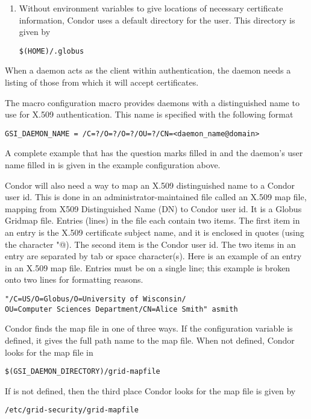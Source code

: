 \begin{description}
\begin{enumerate}
\item
Without environment variables to give locations of necessary
certificate information,
Condor uses a default directory for the user.
This directory is given by 
\begin{verbatim}
$(HOME)/.globus
\end{verbatim}
\end{enumerate}

When a daemon acts as the client within authentication,
the daemon needs a listing of those from which it
will accept certificates.

The macro  configuration macro
provides daemons with a distinguished name to use for
X.509 authentication.
This name is specified with the following format
\footnotesize
\begin{verbatim}
GSI_DAEMON_NAME = /C=?/O=?/O=?/OU=?/CN=<daemon_name@domain>
\end{verbatim}
\normalsize
A complete example that has the question marks filled in and the
daemon's user name filled in is given in the 
example configuration above.

Condor will also need a way to map an X.509 distinguished
name to a Condor user id.
This is done in an administrator-maintained file called an X.509 map file,
mapping from X509 Distinguished Name (DN) to Condor user id.
It is a Globus Gridmap file.
Entries (lines) in the file each contain two items.
The first item in an entry is the 
X.509 certificate subject name, and it is enclosed in quotes
(using the character \verb@"@).
The second item is the Condor user id.
The two items in an entry are separated by tab or space character(s).
Here is an example of an entry in an X.509 map file.
Entries must be on a single line; this example is broken
onto two lines for formatting reasons.

\footnotesize
\begin{verbatim}
"/C=US/O=Globus/O=University of Wisconsin/
OU=Computer Sciences Department/CN=Alice Smith" asmith
\end{verbatim}
\normalsize

Condor finds the map file in one of three ways.
If the configuration variable  is defined,
it gives the full path name to the map file.
When not defined,
Condor looks for the map file in 
\begin{verbatim}
$(GSI_DAEMON_DIRECTORY)/grid-mapfile
\end{verbatim}
If  is not defined,
then the third place Condor looks for the map file is given by
\begin{verbatim}
/etc/grid-security/grid-mapfile
\end{verbatim}

\end{description}

